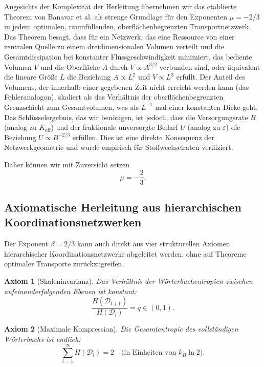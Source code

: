 \documentclass[11pt,a4paper]{article}
\newtheorem{axiom}{Axiom}[section]
\begin{document}
	Angesichts der Komplexität der Herleitung übernehmen wir das etablierte Theorem von Banavar et al. als strenge Grundlage für den Exponenten \(\mu = -2/3\) in jedem optimalen, raumfüllenden, oberflächenbegrenzten Transportnetzwerk. Das Theorem besagt, dass für ein Netzwerk, das eine Ressource von einer zentralen Quelle zu einem dreidimensionalen Volumen verteilt und die Gesamtdissipation bei konstanter Flussgeschwindigkeit minimiert, das bediente Volumen \(V\) und die Oberfläche \(A\) durch \(V \propto A^{3/2}\) verbunden sind, oder äquivalent die lineare Größe \(L\) die Beziehung \(A \propto L^2\) und \(V \propto L^3\) erfüllt. Der Anteil des Volumens, der innerhalb einer gegebenen Zeit nicht erreicht werden kann (das Fehleranalogon), skaliert als das Verhältnis der oberflächenbegrenzten Grenzschicht zum Gesamtvolumen, was als \(L^{-1}\) mal einer konstanten Dicke geht. Das Schlüsselergebnis, das wir benötigen, ist jedoch, dass die Versorgungsrate \(B\) (analog zu \(K_{\mathrm{eff}}\)) und der fraktionale unversorgte Bedarf \(U\) (analog zu \(\varepsilon\)) die Beziehung \(U \propto B^{-2/3}\) erfüllen. Dies ist eine direkte Konsequenz der Netzwerkgeometrie und wurde empirisch für Stoffwechselraten verifiziert.
	
	Daher können wir mit Zuversicht setzen
	\[
	\mu = -\frac{2}{3}. \label{eq:mu}
	\]
	
	\subsection{Axiomatische Herleitung aus hierarchischen Koordinationsnetzwerken}
	\label{subsec:axiomatic-beta}
	
	Der Exponent \(\beta = 2/3\) kann auch direkt aus vier strukturellen Axiomen hierarchischer Koordinationsnetzwerke abgeleitet werden, ohne auf Theoreme optimaler Transporte zurückzugreifen.
	
	\begin{axiom}[Skaleninvarianz]
		\label{ax:A1}
		Das Verhältnis der Wörterbuchentropien zwischen aufeinanderfolgenden Ebenen ist konstant:
		\[
		\frac{H(\mathcal{D}_{l+1})}{H(\mathcal{D}_l)} = q \in (0,1).
		\]
	\end{axiom}
	
	\begin{axiom}[Maximale Kompression]
		\label{ax:A2}
		Die Gesamtentropie des vollständigen Wörterbuchs ist endlich:
		\[
		\sum_{l=1}^{\infty} H(\mathcal{D}_l) = 2 \quad \text{(in Einheiten von } k_B\ln 2).
		\]
	\end{axiom}
	
\end{document}
